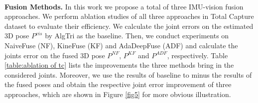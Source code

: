 \documentclass[lettersize,journal]{IEEEtran}
\begin{document}
~\\
\noindent \textbf{Fusion Methods.}
\quad In this work we propose a total of three IMU-vision fusion approaches. We perform ablation studies of all three approaches in Total Capture dataset to evaluate their efficiency. We calculate the joint errors on the estimated 3D pose $P^{vis}$ by AlgTri as the baseline. Then, we conduct experiments on NaiveFuse (NF), KineFuse (KF) and AdaDeepFuse (ADF) and calculate the joints error on the fused 3D pose $P^{NF}$, $P^{KF}$ and $P^{ADF}$, respectively. Table \ref{table:ablation of tc} lists the improvements the three methods bring in the considered joints. Moreover, we use the results of baseline to minus the results of the fused poses and obtain the respective joint error improvement of three approaches, which are shown in Figure \ref{fig5} for more obvious illustration. 
\end{document}
